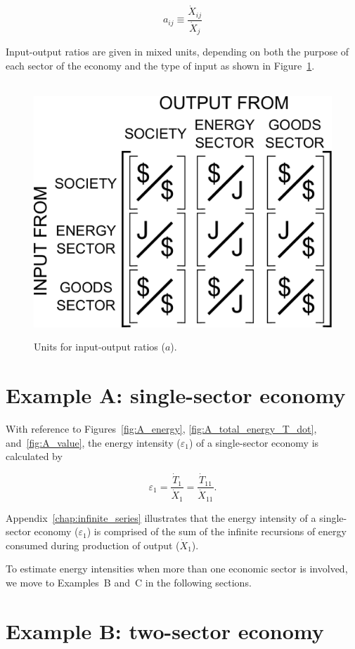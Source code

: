 \begin{equation} \label{eq:aij_def}
	a_{ij} \equiv \frac{\dot{X}_{ij}}{\dot{X}_{j}}
\end{equation}

Input-output ratios are given in mixed units, 
depending on both the purpose of each sector of the economy 
and the type of input as shown in Figure~\ref{fig:A_matrix_units}.

\begin{figure}[h!]
\centering\
\includegraphics[width=0.4\linewidth]{Part_2/Chapter_Intensity/images/I-O_units.pdf}
\caption[Units for input-output ratios]{ Units for input-output ratios ($a$).}
\label{fig:A_matrix_units}
\end{figure}


\section{Example A: single-sector economy} %

With reference to Figures~\ref{fig:A_energy}, 
\ref{fig:A_total_energy_T_dot}, 
and~\ref{fig:A_value},
the energy intensity ($\varepsilon_{1}$) of a single-sector economy is calculated by

\begin{equation} \label{eq:A-energy_intensity}
	\varepsilon_{1} 
	= \frac{\dot{T}_{1}}{\dot{X}_{1}} 
	= \frac{\dot{T}_{11}}{\dot{X}_{11}}.
\end{equation}

Appendix~\ref{chap:infinite_series} illustrates that the energy 
intensity of a single-sector economy ($\varepsilon_{1}$) 
is comprised of the sum of the infinite recursions
of energy consumed during production of output ($\dot{X}_{1}$).

To estimate energy intensities
when more than one economic sector is involved, 
we move to Examples~B and~C in the following sections.


\section{Example B: two-sector economy} %

